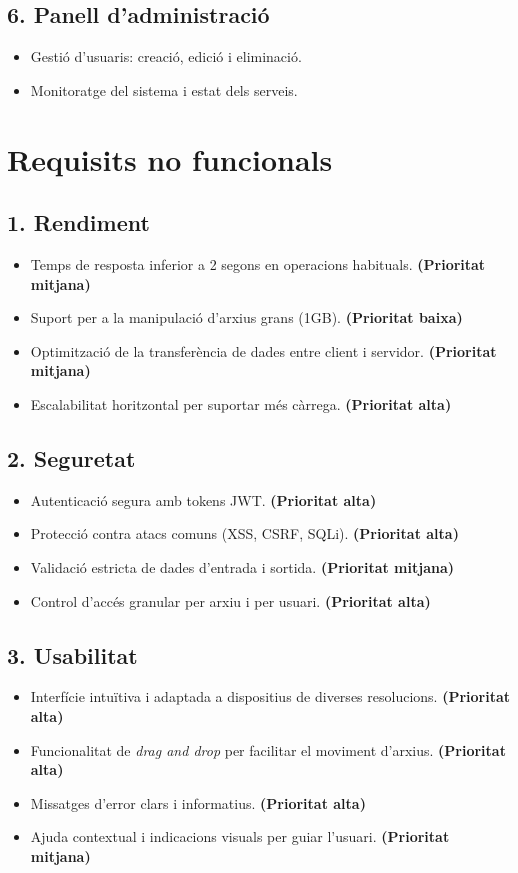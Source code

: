 \subsection{6. Panell d'administració}
\begin{itemize}
  \item Gestió d'usuaris: creació, edició i eliminació.
  \item Monitoratge del sistema i estat dels serveis.
\end{itemize}

\section{Requisits no funcionals}

\subsection{1. Rendiment}
\begin{itemize}
  \item Temps de resposta inferior a 2 segons en operacions habituals. \textbf{(Prioritat mitjana)}
  \item Suport per a la manipulació d'arxius grans (\>1GB). \textbf{(Prioritat baixa)}
  \item Optimització de la transferència de dades entre client i servidor. \textbf{(Prioritat mitjana)}
  \item Escalabilitat horitzontal per suportar més càrrega. \textbf{(Prioritat alta)}
\end{itemize}

\subsection{2. Seguretat}
\begin{itemize}
  \item Autenticació segura amb tokens JWT. \textbf{(Prioritat alta)}
  \item Protecció contra atacs comuns (XSS, CSRF, SQLi). \textbf{(Prioritat alta)}
  \item Validació estricta de dades d'entrada i sortida. \textbf{(Prioritat mitjana)}
  \item Control d'accés granular per arxiu i per usuari. \textbf{(Prioritat alta)}
\end{itemize}

\subsection{3. Usabilitat}
\begin{itemize}
  \item Interfície intuïtiva i adaptada a dispositius de diverses resolucions. \textbf{(Prioritat alta)}
  \item Funcionalitat de \textit{drag and drop} per facilitar el moviment d'arxius. \textbf{(Prioritat alta)}
  \item Missatges d'error clars i informatius. \textbf{(Prioritat alta)}
  \item Ajuda contextual i indicacions visuals per guiar l'usuari. \textbf{(Prioritat mitjana)}
\end{itemize}

